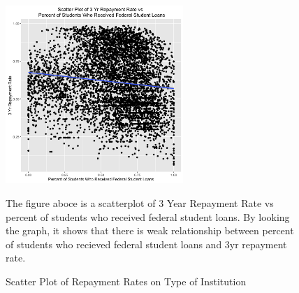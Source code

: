 \begin{figure}
  \caption{Scatter Plot of Repayment Rates on Type of Institution}
  \centering
  \includegraphics[width=0.6\textwidth]{../images/eda/pctfloan_rpy3yr_scatter}
  \centering
  \newline
  
  \raggedright
The figure aboce is a scatterplot of 3 Year Repayment Rate vs percent of students who received federal student loans. By looking the graph, it shows that there is weak relationship between percent of students who recieved federal student loans and 3yr repayment rate.
\end{figure}


